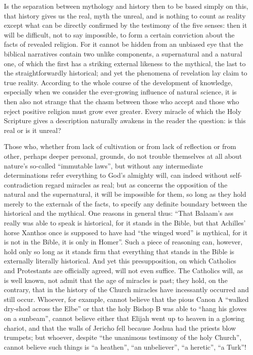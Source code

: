 \documentclass[12pt,a4paper,openany]{book}
\newcommand{\opage}[1]{\marginnote{\footnotesize\textit{[#1]}}}
\begin{document}
Is the separation between mythology and history
then to be based simply on this, that history gives us the real,
myth the unreal, and is nothing to count as
reality except what can be directly confirmed by
the testimony of the five senses: then it will be
\setcounter{footnote}{0}%
\opage{428}difficult, not to say impossible, to form a certain
conviction about the facts of revealed religion.
For it cannot be hidden from an unbiased
eye that the biblical narratives contain two unlike
components, a supernatural and a natural one, of which
the first has a striking external likeness to the
mythical, the last to the straightforwardly historical; and
yet the phenomena of revelation lay claim to true
reality. According to the whole course of the development of knowledge, especially when we consider the ever-growing
influence of natural science, it is then also not strange that the chasm between
those who accept and those who reject positive
religion must grow ever greater. Every miracle
of which the Holy Scripture gives a description
naturally awakens in the reader the question:
is this real or is it unreal?

Those who, whether from lack of cultivation or
from lack of reflection or from other, perhaps deeper
personal, grounds, do not trouble themselves at all about nature's
so-called ``immutable laws'', but without any
intermediate determinations refer everything to God's almighty will,
can indeed without self-contradiction regard miracles
as real; but as concerns the opposition of the
natural and the supernatural, it will be impossible for them, so long
as they hold merely to the externals of the facts,
to specify any definite boundary
between the historical and the mythical. One reasons in general
thus: ``That Balaam's ass really was
able to speak is historical, for it stands in the Bible, but
that Achilles' horse Xanthos once is supposed to have had ``the
winged word'' is mythical, for it is not in the
\setcounter{footnote}{0}%
\opage{429}Bible, it is only in Homer''. Such a piece of reasoning
can, however, hold only so long as it stands
firm that everything that stands in the Bible is externally
literally historical. And yet this presupposition,
on which Catholics and Protestants are officially agreed,
will not even suffice. The Catholics will, as is well known,
not admit that the age of miracles is past; they hold,
on the contrary, that in the history of the Church miracles have incessantly occurred
and still occur. Whoever, for example, cannot believe
that the pious Canon A ``walked dry-shod across
the Elbe'' or that the holy Bishop B was able to ``hang
his gloves on a sunbeam'', cannot believe either that Elijah went up to heaven in a glowing chariot, and that the walls
of Jericho fell because Joshua had the priests blow trumpets;
but whoever, despite ``the unanimous testimony of the holy Church'',
cannot believe such things is ``a heathen'',
``an unbeliever'', ``a heretic'', ``a Turk''!
\end{document}
